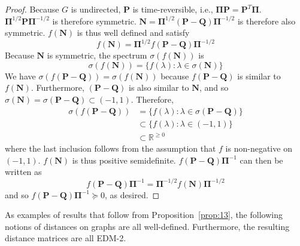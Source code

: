 \documentclass[10pt,twocolumn]{article}
\numberwithin{equation}{section}
\begin{document}
\begin{proof}
  Because $G$ is undirected, $\mathbf{P}$ is time-reversible,
  i.e., $\bm{\Pi}\mathbf{P} =
  \mathbf{P}^{T}\bm{\Pi}$. $\bm{\Pi}^{1/2}\mathbf{P}\bm{\Pi}^{-1/2}$
  is therefore symmetric. $\mathbf{N} =
  \bm{\Pi}^{1/2}(\mathbf{P} - \mathbf{Q})\bm{\Pi}^{-1/2}$ is
  therefore also symmetric. $f(\mathbf{N})$ is thus well defined and
  satisfy
  \begin{equation}
    \label{eq:66}
    f(\mathbf{N}) = \bm{\Pi}^{1/2}f(\mathbf{P} - \mathbf{Q})\bm{\Pi}^{-1/2}
  \end{equation}
  Because $\mathbf{N}$ is symmetric, the spectrum 
  $\sigma(f(\mathbf{N}))$ is
  \begin{equation}
    \label{eq:67}
    \sigma(f(\mathbf{N})) = \{ f(\lambda) \colon \lambda \in
    \sigma(\mathbf{N}) \}
  \end{equation}
  We have $\sigma(f(\mathbf{P} - \mathbf{Q})) = \sigma(f(\mathbf{N}))$
  because $f(\mathbf{P} - \mathbf{Q})$ is similar to
  $f(\mathbf{N})$. Furthermore, $(\mathbf{P} - \mathbf{Q})$ is also
  similar to $\mathbf{N}$, and so $\sigma(\mathbf{N}) =
  \sigma(\mathbf{P} - \mathbf{Q}) \subset (-1,1)$. Therefore,
  \begin{equation}
    \label{eq:68}
    \begin{split}
    \sigma(f(\mathbf{P} - \mathbf{Q})) &= \{ f(\lambda) \colon \lambda \in
    \sigma(\mathbf{P} - \mathbf{Q})\} \\ &\subset \{ f(\lambda) \colon
    \lambda \in (-1,1) \} \\
    &\subset \mathbb{R}^{\geq 0}
    \end{split}
  \end{equation}
  where the last inclusion follows from the assumption that $f$ is
  non-negative on $(-1,1)$. $f(\mathbf{N})$ is thus positive
  semidefinite. $f(\mathbf{P} - \mathbf{Q})\bm{\Pi}^{-1}$ can then be
  written as
  \begin{equation}
    \label{eq:69}
f(\mathbf{P} - \mathbf{Q})\bm{\Pi}^{-1} = \bm{\Pi}^{-1/2}
f(\mathbf{N}) \bm{\Pi}^{-1/2}
  \end{equation}
and so $f(\mathbf{P} - \mathbf{Q})\bm{\Pi}^{-1} \succeq
0$, as desired. 
\end{proof}
As examples of results that follow from Proposition~\ref{prop:13}, the
following notions of distances on graphs are all
well-defined. Furthermore, the resulting distance matrices are all
EDM-2.
\end{document}
